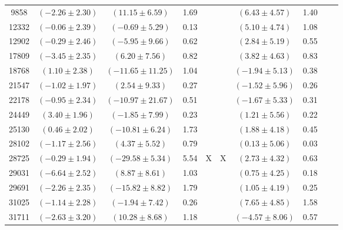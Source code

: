 \documentclass [10pt, twoside] {uwthesis}[2012/04/02]
\begin{document}
{\begin{longtable}[t]{|c|c|cccc|cccc|}
9858	&  $(	-2.26	  \pm  	2.30	)$  &  $(	11.15	  \pm  	6.59	)$  &  	1.69	  &  		  &  		  &  $(	6.43	  \pm  	4.57	)$  &  	1.40	  &  		  &  		  \\
12332	&  $(	-0.06	  \pm  	2.39	)$  &  $(	-0.69	  \pm  	5.29	)$  &  	0.13	  &  		  &  		  &  $(	5.10	  \pm  	4.74	)$  &  	1.08	  &  		  &  		  \\
12902	&  $(	-0.29	  \pm  	2.46	)$  &  $(	-5.95	  \pm  	9.66	)$  &  	0.62	  &  		  &  		  &  $(	2.84	  \pm  	5.19	)$  &  	0.55	  &  		  &  		  \\
17809	&  $(	-3.45	  \pm  	2.35	)$  &  $(	6.20	  \pm  	7.56	)$  &  	0.82	  &  		  &  		  &  $(	3.82	  \pm  	4.63	)$  &  	0.83	  &  		  &  		  \\
18768	&  $(	1.10	  \pm  	2.38	)$  &  $(	-11.65	  \pm  	11.25	)$  &  	1.04	  &  		  &  		  &  $(	-1.94	  \pm  	5.13	)$  &  	0.38	  &  		  &  		  \\
21547	&  $(	-1.02	  \pm  	1.97	)$  &  $(	2.54	  \pm  	9.33	)$  &  	0.27	  &  		  &  		  &  $(	-1.52	  \pm  	5.96	)$  &  	0.26	  &  		  &  		  \\
22178	&  $(	-0.95	  \pm  	2.34	)$  &  $(	-10.97	  \pm  	21.67	)$  &  	0.51	  &  		  &  		  &  $(	-1.67	  \pm  	5.33	)$  &  	0.31	  &  		  &  		  \\
24449	&  $(	3.40	  \pm  	1.96	)$  &  $(	-1.85	  \pm  	7.99	)$  &  	0.23	  &  		  &  		  &  $(	1.21	  \pm  	5.56	)$  &  	0.22	  &  		  &  		  \\
25130	&  $(	0.46	  \pm  	2.02	)$  &  $(	-10.81	  \pm  	6.24	)$  &  	1.73	  &  		  &  		  &  $(	1.88	  \pm  	4.18	)$  &  	0.45	  &  		  &  		  \\
28102	&  $(	-1.17	  \pm  	2.56	)$  &  $(	4.37	  \pm  	5.52	)$  &  	0.79	  &  		  &  		  &  $(	0.13	  \pm  	5.06	)$  &  	0.03	  &  		  &  		  \\
28725	&  $(	-0.29	  \pm  	1.94	)$  &  $(	-29.58	  \pm  	5.34	)$  &  	5.54	  &  	X	  &  	X	  &  $(	2.73	  \pm  	4.32	)$  &  	0.63	  &  		  &  		  \\
29031	&  $(	-6.64	  \pm  	2.52	)$  &  $(	8.87	  \pm  	8.61	)$  &  	1.03	  &  		  &  		  &  $(	0.75	  \pm  	4.25	)$  &  	0.18	  &  		  &  		  \\
29691	&  $(	-2.26	  \pm  	2.35	)$  &  $(	-15.82	  \pm  	8.82	)$  &  	1.79	  &  		  &  		  &  $(	1.05	  \pm  	4.19	)$  &  	0.25	  &  		  &  		  \\
31025	&  $(	-1.14	  \pm  	2.28	)$  &  $(	-1.94	  \pm  	7.42	)$  &  	0.26	  &  		  &  		  &  $(	7.65	  \pm  	4.85	)$  &  	1.58	  &  		  &  		  \\
31711	&  $(	-2.63	  \pm  	3.20	)$  &  $(	10.28	  \pm  	8.68	)$  &  	1.18	  &  		  &  		  &  $(	-4.57	  \pm  	8.06	)$  &  	0.57	  &  		  &  		  \\

\end{longtable}}
\end{document}
